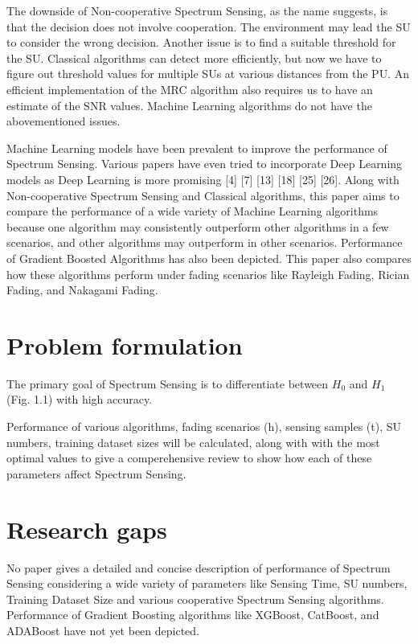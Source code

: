 The downside of Non-cooperative Spectrum Sensing, as the name suggests, is that the decision does not involve cooperation. The environment may lead the SU to consider the wrong decision. Another issue is to find a suitable threshold for the SU. Classical algorithms can detect more efficiently, but now we have to figure out threshold values for multiple SUs at various distances from the PU. An efficient implementation of the MRC algorithm also requires us to have an estimate of the SNR values. Machine Learning algorithms do not have the abovementioned issues.

Machine Learning models have been prevalent to improve the performance of Spectrum Sensing. Various papers have even tried to incorporate Deep Learning models as Deep Learning is more promising [4] [7] [13] [18] [25] [26]. Along with Non-cooperative Spectrum Sensing and Classical algorithms, this paper aims to compare the performance of a wide variety of Machine Learning algorithms because one algorithm may consistently outperform other algorithms in a few scenarios, and other algorithms may outperform in other scenarios. Performance of Gradient Boosted Algorithms has also been depicted. This paper also compares how these algorithms perform under fading scenarios like Rayleigh Fading, Rician Fading, and Nakagami Fading.


\section{Problem formulation}
The primary goal of Spectrum Sensing is to differentiate between $H_{0}$ and $H_{1}$ (Fig. 1.1) with high accuracy.

Performance of various algorithms, fading scenarios (h), sensing samples (t), SU numbers, training dataset sizes will be calculated, along with with the most optimal values to give a comperehensive review to show how each of these parameters affect Spectrum Sensing.

\section{Research gaps}
No paper gives a detailed and concise description of performance of Spectrum Sensing considering a wide variety of parameters like Sensing Time, SU numbers, Training Dataset Size and various cooperative Spectrum Sensing algorithms. Performance of Gradient Boosting algorithms like XGBoost, CatBoost, and ADABoost have not yet been depicted. 